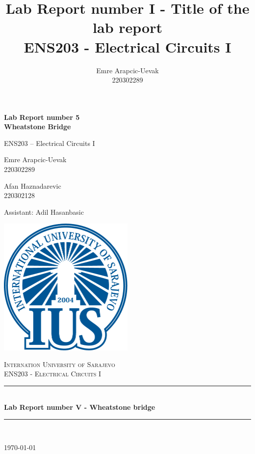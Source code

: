 \documentclass[a4paper, 10pt]{article}
\title{Lab Report number I - Title of the lab report\\
	ENS203 - Electrical Circuits I}
\author{Emre Arapcic-Uevak\\220302289}
\date{}
\begin{document}
	\begin{titlepage}
		\begin{center}

			{\Large\bfseries Lab Report number 5 \\[0.5em] Wheatstone Bridge\par}
			\vspace{1cm} %

			{\large ENS203 – Electrical Circuits I\par}
			\vspace{1cm} %

			{\large Emre Arapcic-Uevak \\ 220302289\par}
			\vspace{1cm} %

			{\large Afan Haznadarevic \\ 220302128\par}
			\vspace{.5cm} %

			{\large Assistant: Adil Hasanbasic\par}
			\includegraphics[width=0.5\textwidth]{Logo.png}
			\vspace{5mm}
			
			\textsc{\LARGE Internation University of Sarajevo}\\[1.5cm]
			\textsc{\Large ENS203 - Electrical Circuits I}\\[0.5cm]
			
			\rule{\linewidth}{0.5mm} \\[0.4cm]
			{ \huge \bfseries Lab Report number V - Wheatstone bridge}\\[0.4cm]
			\rule{\linewidth}{0.5mm} \\[1.5cm]
			
			\vfill
			
			{\large \today}
		\end{center}
	\end{titlepage}
	\pagebreak
\end{document}
